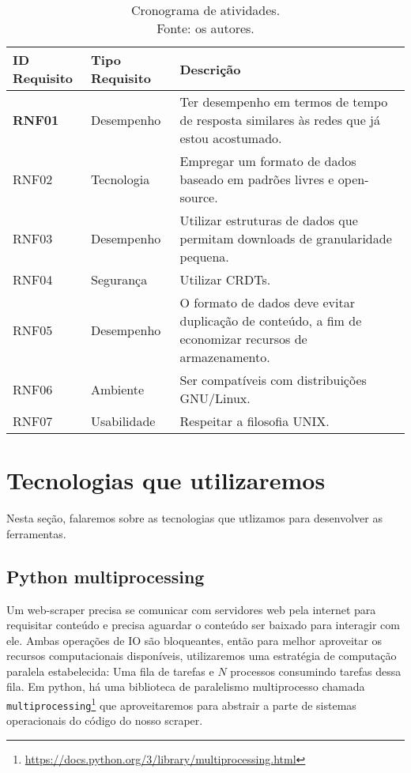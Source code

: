 {
\renewcommand{\arraystretch}{3}
\begin{table}[!htbp]
    \centering
    \begin{tabularx}{\textwidth}{|X|X|X|}
        \hline
        \centering \textbf{ID Requisito}  & \centering  \textbf{Tipo Requisito} & \textbf{Descrição} \\
        \hline
        \textbf{RNF01}       & Desempenho       &            Ter desempenho em termos de tempo de resposta similares às redes que já estou acostumado.                \\
        \hline
        RNF02   & Tecnologia      &        Empregar um formato de dados baseado em padrões livres e open-source.     \\
        \hline
        RNF03 &   Desempenho    & Utilizar estruturas de dados que permitam downloads de granularidade pequena.         \\
        \hline
        RNF04     &   Segurança         & Utilizar CRDTs.    \\
        \hline
        RNF05 &    Desempenho     & O formato de dados deve evitar duplicação de conteúdo, a fim de economizar recursos de armazenamento.   \\
        \hline
        RNF06     &  Ambiente         & Ser compatíveis com distribuições GNU/Linux.               \\
        \hline
        RNF07  &    Usabilidade        & Respeitar a filosofia UNIX.   \\
        \hline
    \end{tabularx}
    \caption{\label{tab:non-func-reqs}
        Cronograma de atividades.\\
        Fonte: os autores.
    }
\end{table}}

\section{Tecnologias que utilizaremos}

Nesta seção, falaremos sobre as tecnologias que utlizamos para desenvolver as ferramentas.

\subsection{Python multiprocessing}

Um web-scraper precisa se comunicar com servidores web pela internet para requisitar conteúdo e precisa aguardar o conteúdo ser baixado para interagir com ele.
Ambas operações de IO são bloqueantes, então para melhor aproveitar os recursos computacionais disponíveis, utilizaremos uma estratégia de computação paralela estabelecida: Uma fila de tarefas e $N$ processos consumindo tarefas dessa fila.
Em python, há uma biblioteca de paralelismo multiprocesso chamada \texttt{multiprocessing}\footnote{\url{https://docs.python.org/3/library/multiprocessing.html}} que aproveitaremos para abstrair a parte de sistemas operacionais do código do nosso scraper.


